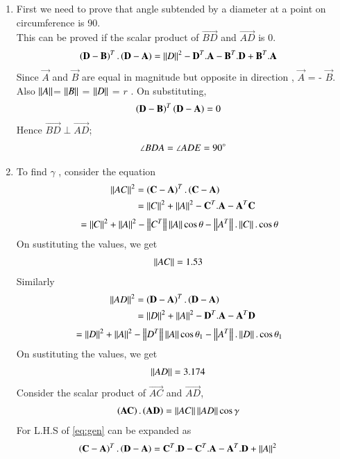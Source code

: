 \renewcommand{\theequation}{\theenumi}
\begin{enumerate}[label=\thesection.\arabic*.,ref=\thesection.\theenumi]

\item First we need to prove that angle subtended by a diameter at a point on circumference is 90\degree. \\
This can be proved if the scalar product of $\vec{BD}$ and $\vec{AD}$ is 0.
\begin{align}
\left(\mathbf{D}-\mathbf{B}\right)^T.\left(\mathbf{D}-\mathbf{A}\right) &= \left\lVert D\right\rVert^2 - \mathbf{D}^T.\mathbf{A} - \mathbf{B}^T.\mathbf{D} + \mathbf{B}^T.\mathbf{A}
\end{align}
Since $\vec{A}$ and $\vec{B}$ are equal in magnitude but opposite in direction , $\vec{A}$ = - $\vec{B}$. Also $\left\lVert A\right\rVert$= $\left\lVert B\right\rVert$ = $\left\lVert D\right\rVert$ = $r$ . On substituting,
\begin{align}
 \left(\mathbf{D}-\mathbf{B}\right)^T \left(\mathbf{D}-\mathbf{A}\right) &= 0
\end{align}
Hence $\vec{BD} \perp \vec{AD}$; 
\begin{align}
\angle BDA = \angle ADE = 90\degree
\label{eq:angleADE}
\end{align}

\item To find $\gamma$ ,
consider the equation
\begin{align}
\left\lVert AC\right\rVert^2 &=  \left(\mathbf{C} - \mathbf{A}\right)^T. \left(\mathbf{C} - \mathbf{A}\right) \\
 &= \left\lVert C\right\rVert^2 + \left\lVert A\right\rVert^2  - \mathbf{C}^T.\mathbf{A} - \mathbf{A}^T\mathbf{C} 
\end{align}
\begin{align}
 &= \left\lVert C\right\rVert^2 + \left\lVert A\right\rVert^2 - \left\lVert C^T\right\rVert\left\lVert A\right\rVert\cos\theta - \left\lVert A^T\right\rVert.\left\lVert C\right\rVert.\cos\theta
\end{align}
On sustituting the values, we get 
\begin{align}
\left\lVert AC\right\rVert &= 1.53
\label{eq:AC}
\end{align}
Similarly 
\begin{align}
\left\lVert AD\right\rVert^2 &= \left(\mathbf{D} - \mathbf{A}\right)^T.\left(\mathbf{D} - \mathbf{A}\right) \\
 &= \left\lVert D\right\rVert^2 + \left\lVert A\right\rVert^2  - \mathbf{D}^T.\mathbf{A} - \mathbf{A}^T\mathbf{D} 
\end{align}
\begin{align}
 &= \left\lVert D\right\rVert^2 + \left\lVert A\right\rVert^2 - \left\lVert D^T\right\rVert\left\lVert A\right\rVert\cos\theta_1 - \left\lVert A^T\right\rVert.\left\lVert D\right\rVert.\cos\theta_1
\end{align}
On sustituting the values, we get 
\begin{align}
\left\lVert AD\right\rVert &= 3.174
\label{eq:AD}
\end{align}
Consider the scalar product of $\vec{AC}$ and $\vec{AD}$,
\begin{align}
\left(\mathbf{AC}\right).\left(\mathbf{AD}\right) &= \left\lVert AC\right\rVert\left\lVert AD\right\rVert\cos\gamma
\label{eq:gen}
\end{align}
For L.H.S of \eqref{eq:gen} can be expanded as
\begin{align}
\left(\mathbf{C} - \mathbf{A}\right)^T.\left(\mathbf{D} - \mathbf{A}\right) &= \mathbf{C}^T.\mathbf{D} - \mathbf{C}^T.\mathbf{A} - \mathbf{A}^T.\mathbf{D} + \left\lVert A\right\rVert^2 
\end{align}


\end{enumerate}
